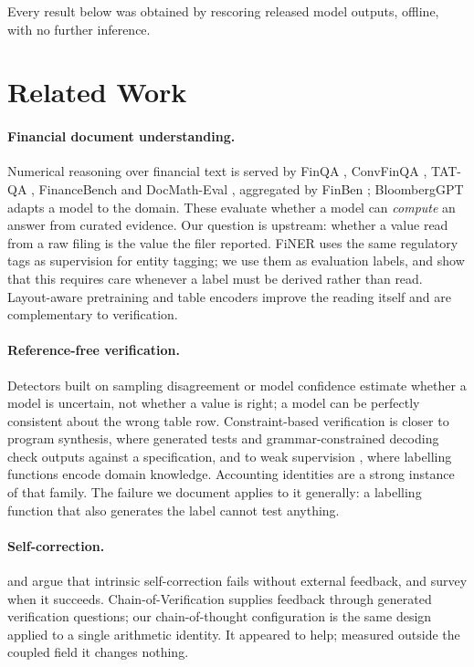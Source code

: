 \documentclass[11pt]{article}
\begin{document}
Every result below was obtained by rescoring released model outputs, offline, with no
further inference.

\section{Related Work}

\paragraph{Financial document understanding.}
Numerical reasoning over financial text is served by FinQA \citep{chen2021finqa},
ConvFinQA \citep{chen2022convfinqa}, TAT-QA \citep{zhu2021tatqa}, FinanceBench
\citep{islam2023financebench} and DocMath-Eval \citep{zhou2023docmath}, aggregated by
FinBen \citep{xie2024finben}; BloombergGPT \citep{wu2023bloomberggpt} adapts a model to
the domain. These evaluate whether a model can \emph{compute} an answer from curated
evidence. Our question is upstream: whether a value read from a raw filing is the value
the filer reported. FiNER \citep{loukas2022finer} uses the same regulatory tags as
supervision for entity tagging; we use them as evaluation labels, and show that this
requires care whenever a label must be derived rather than read. Layout-aware
pretraining \citep{xu2020layoutlm} and table encoders \citep{herzig2020tapas} improve
the reading itself and are complementary to verification.

\paragraph{Reference-free verification.}
Detectors built on sampling disagreement \citep{manakul2023selfcheckgpt} or model
confidence \citep{kadavath2022know} estimate whether a model is uncertain, not whether
a value is right; a model can be perfectly consistent about the wrong table row.
Constraint-based verification is closer to program synthesis, where generated tests
\citep{chen2023codet} and grammar-constrained decoding
\citep{poesia2022synchromesh,willard2023efficient} check outputs against a
specification, and to weak supervision \citep{ratner2017snorkel}, where labelling
functions encode domain knowledge. Accounting identities are a strong instance of that
family. The failure we document applies to it generally: a labelling function that also
generates the label cannot test anything.

\paragraph{Self-correction.}
\citet{huang2024selfcorrect} and \citet{stechly2024selfverification} argue that
intrinsic self-correction fails without external feedback, and \citet{kamoi2024when}
survey when it succeeds. Chain-of-Verification \citep{dhuliawala2023chain} supplies
feedback through generated verification questions; our chain-of-thought configuration
is the same design applied to a single arithmetic identity. It appeared to help;
measured outside the coupled field it changes nothing.
\end{document}
